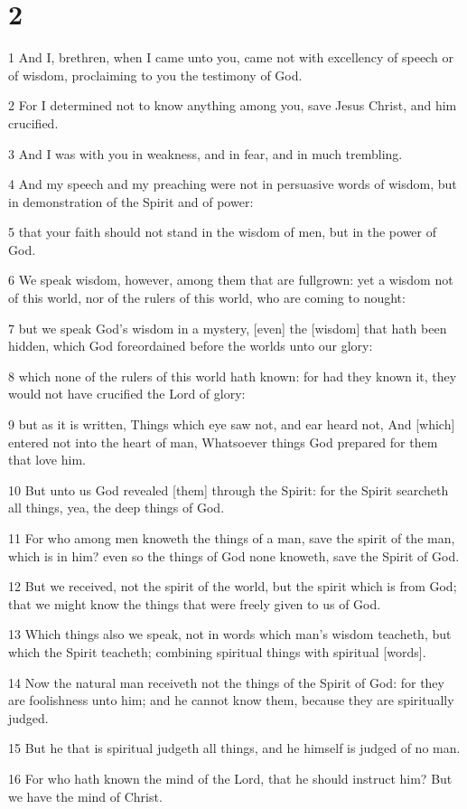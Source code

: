 \chapter{2}

\par 1 And I, brethren, when I came unto you, came not with excellency of speech or of wisdom, proclaiming to you the testimony of God.
\par 2 For I determined not to know anything among you, save Jesus Christ, and him crucified.
\par 3 And I was with you in weakness, and in fear, and in much trembling.
\par 4 And my speech and my preaching were not in persuasive words of wisdom, but in demonstration of the Spirit and of power:
\par 5 that your faith should not stand in the wisdom of men, but in the power of God.
\par 6 We speak wisdom, however, among them that are fullgrown: yet a wisdom not of this world, nor of the rulers of this world, who are coming to nought:
\par 7 but we speak God's wisdom in a mystery, [even] the [wisdom] that hath been hidden, which God foreordained before the worlds unto our glory:
\par 8 which none of the rulers of this world hath known: for had they known it, they would not have crucified the Lord of glory:
\par 9 but as it is written, Things which eye saw not, and ear heard not, And [which] entered not into the heart of man, Whatsoever things God prepared for them that love him.
\par 10 But unto us God revealed [them] through the Spirit: for the Spirit searcheth all things, yea, the deep things of God.
\par 11 For who among men knoweth the things of a man, save the spirit of the man, which is in him? even so the things of God none knoweth, save the Spirit of God.
\par 12 But we received, not the spirit of the world, but the spirit which is from God; that we might know the things that were freely given to us of God.
\par 13 Which things also we speak, not in words which man's wisdom teacheth, but which the Spirit teacheth; combining spiritual things with spiritual [words].
\par 14 Now the natural man receiveth not the things of the Spirit of God: for they are foolishness unto him; and he cannot know them, because they are spiritually judged.
\par 15 But he that is spiritual judgeth all things, and he himself is judged of no man.
\par 16 For who hath known the mind of the Lord, that he should instruct him? But we have the mind of Christ.

